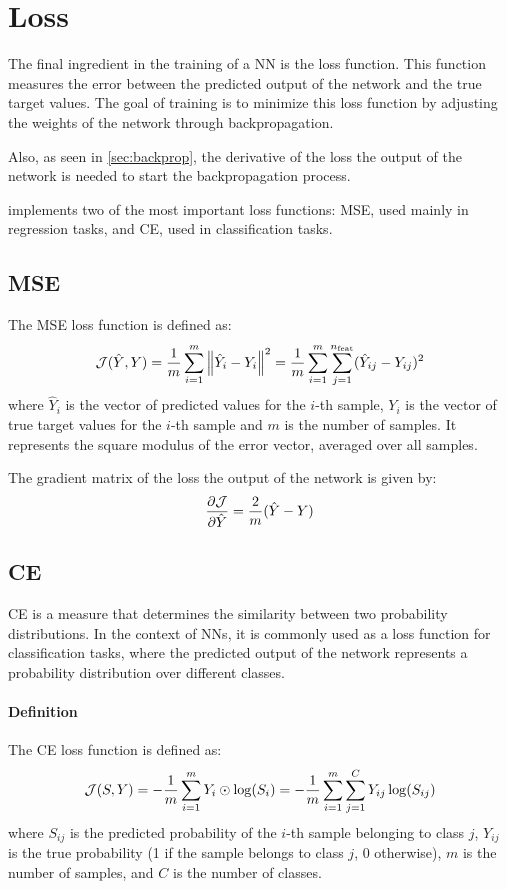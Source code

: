 \section{Loss} \label{sec:loss}

The final ingredient in the training of a \acl{NN} is the loss function. This function measures the error between the predicted output of the network and the true target values. The goal of training is to minimize this loss function by adjusting the weights of the network through backpropagation.

Also, as seen in \cref{sec:backprop}, the derivative of the loss \wrt the output of the network is needed to start the backpropagation process.

\mfnet implements two of the most important loss functions: \ac{MSE}, used mainly in regression tasks, and \ac{CE}, used in classification tasks.

\subsection{\acl{MSE}}
The \ac{MSE} loss function is defined as:
\begin{equation}
    \mathcal{J}(\hat{Y}, Y) = \frac{1}{m} \sum_{i=1}^{m} \norm{\hat{Y}_i - Y_i}^2 = \frac{1}{m} \sum_{i=1}^{m} \sum_{j=1}^{n_\text{feat}} (\hat{Y}_{ij} - Y_{ij})^2
\end{equation}
where $\hat{Y}_i$ is the vector of predicted values for the $i$-th sample, $Y_i$ is the vector of true target values for the $i$-th sample and $m$ is the number of samples. It represents the square modulus of the error vector, averaged over all samples.

The gradient matrix of the loss \wrt the output of the network is given by:
\begin{equation}
    \pdv{\mathcal{J}}{\hat{Y}} = \frac{2}{m} (\hat{Y} - Y)
\end{equation}

\subsection{\acl{CE}}
\acl{CE} is a measure that determines the similarity between two probability distributions. In the context of \aclp{NN}, it is commonly used as a loss function for classification tasks, where the predicted output of the network represents a probability distribution over different classes.

\paragraph{Definition}
The \ac{CE} loss function is defined as:
\begin{equation}
    \mathcal{J}(S, Y) = -\frac{1}{m} \sum_{i=1}^{m} Y_i \odot \log(S_i) = -\frac{1}{m} \sum_{i=1}^{m} \sum_{j=1}^{C} Y_{ij} \log(S_{ij})
\end{equation}
where $S_{ij}$ is the predicted probability of the $i$-th sample belonging to class $j$, $Y_{ij}$ is the true probability (1 if the sample belongs to class $j$, 0 otherwise), $m$ is the number of samples, and $C$ is the number of classes.

